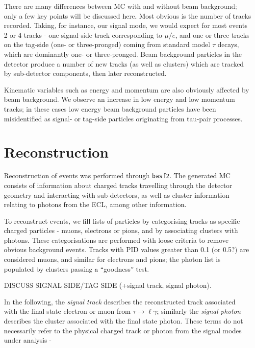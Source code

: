 \documentclass[12pt]{thesis}  %
\begin{document}
    
There are many differences between MC with and without beam background; only a few key points will be discussed here. Most obvious is the number of tracks recorded. Taking, for instance, our signal mode, we would expect for most events 2 or 4 tracks - one signal-side track corresponding to $\mu/e$, and one or three tracks on the tag-side (one- or three-pronged) coming from standard model $\tau$ decays, which are dominantly one- or three-pronged. Beam background particles in the detector produce a number of new tracks (as well as clusters) which are tracked by sub-detector components, then later reconstructed.

Kinematic variables such as energy and momentum are also obviously affected by beam background. We observe an increase in low energy and low momentum tracks; in these cases low energy beam background particles have been misidentified as signal- or tag-side particles originating from tau-pair processes.





\pagebreak

\chapter{Reconstruction}

Reconstruction of events was performed through \texttt{basf2}. The generated MC consists of information about charged tracks travelling through the detector geometry and interacting with sub-detectors, as well as cluster information relating 
to photons from the ECL, among other information. 

To reconstruct events, we fill lists of particles by categorising tracks as specific charged particles - muons, electrons or pions, and by associating clusters with photons. These categorisations are performed with loose criteria to remove obvious background events. Tracks with PID values greater than 0.1 (or 0.5?) are considered muons, and similar for electrons and pions; the photon list is populated by clusters passing a ``goodness'' test. 



DISCUSS SIGNAL SIDE/TAG SIDE (+signal track, signal photon).


In the following, the \emph{signal track} describes the reconstructed track associated with the final state electron or muon from $\tau\to\ell\gamma$; similarly the \emph{signal photon} describes the cluster associated with the final state photon. These terms do not necessarily refer to the physical charged track or photon from the signal modes under analysis - 
\end{document}
